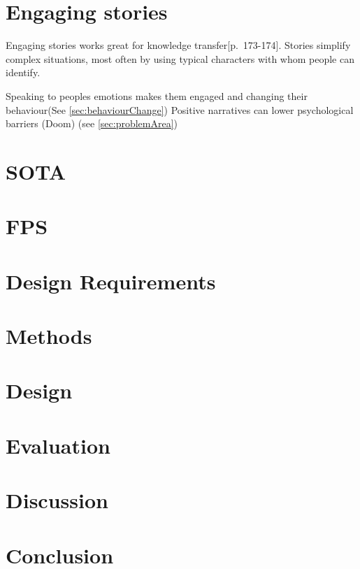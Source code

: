 \section{Engaging stories}
    Engaging stories works great for knowledge transfer\citep{engagingStoryFundamentals}[p.~173-174].
    Stories simplify complex situations, most often by using typical characters with whom people can identify\cite{engagingStoryFundamentals}.

    Speaking to peoples emotions makes them engaged and changing their behaviour\cite{vrEngagementClimateChange}(See \autoref{sec:behaviourChange})
    Positive narratives can lower psychological barriers (Doom) (see \autoref{sec:problemArea})

\section{SOTA}

\section{FPS}

\section{Design Requirements}

\section{Methods}

\section{Design}

\section{Evaluation}

\section{Discussion}

\section{Conclusion}










